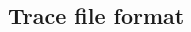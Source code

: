 \documentclass[class=book, crop=false]{standalone}
\begin{document}
\begin{CJK}{UTF8}{gbsn}

\chapter{Trace file format}



\cleardoublepage

\end{CJK}
\end{document}
